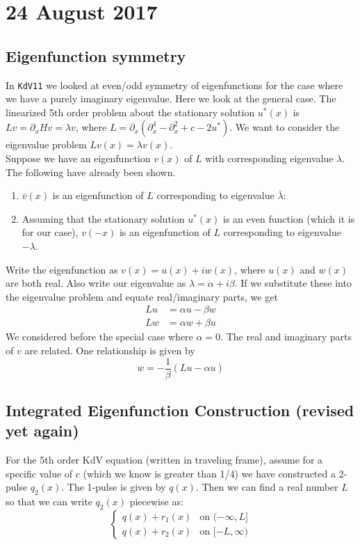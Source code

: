 \documentclass[12pt]{article}
\begin{document}
\section*{24 August 2017}

\subsection*{Eigenfunction symmetry}

In \texttt{KdV11} we looked at even/odd symmetry of eigenfunctions for the case where we have a purely imaginary eigenvalue. Here we look at the general case. The linearized 5th order problem about the stationary solution $u^*(x)$ is $Lv = \partial_x Hv = \lambda v$, where $L = \partial_x( \partial_x^4 - \partial_x^2 + c - 2u^*)$. We want to consider the eigenvalue problem $Lv(x) = \lambda v(x)$. \\

Suppose we have an eigenfunction $v(x)$ of $L$ with corresponding eigenvalue $\lambda$. The following have already been shown.
\begin{enumerate}
	\item $\bar{v}(x)$ is an eigenfunction of $L$ corresponding to eigenvalue $\bar{\lambda}$:
	\item Assuming that the stationary solution $u^*(x)$ is an even function (which it is for our case), $v(-x)$ is an eigenfunction of $L$ corresponding to eigenvalue $-\lambda$.
\end{enumerate}
Write the eigenfunction as $v(x) = u(x) + i w(x)$, where $u(x)$ and $w(x)$ are both real. Also write our eigenvalue as $\lambda = \alpha + i \beta$. If we substitute these into the eigenvalue problem and equate real/imaginary parts, we get
\begin{align*}
Lu &= \alpha u - \beta w \\
Lw &= \alpha w + \beta u
\end{align*}
We considered before the special case where $\alpha = 0$. The real and imaginary parts of $v$ are related. One relationship is given by
\[
w = -\frac{1}{\beta}(Lu - \alpha u)
\]





\subsection*{Integrated Eigenfunction Construction (revised yet again)}
For the 5th order KdV equation (written in traveling frame), assume for a specific value of $c$ (which we know is greater than 1/4) we have constructed a 2-pulse $q_2(x)$. The 1-pulse is given by $q(x)$. Then we can find a real number $L$ so that we can write $q_2(x)$ piecewise as:
\begin{equation}\label{q2piecewise}
\begin{cases}
q(x) + r_1(x) & \text{on } (-\infty, L] \\
q(x) + r_2(x) & \text{on } [-L, \infty)
\end{cases}
\end{equation}
\end{document}
